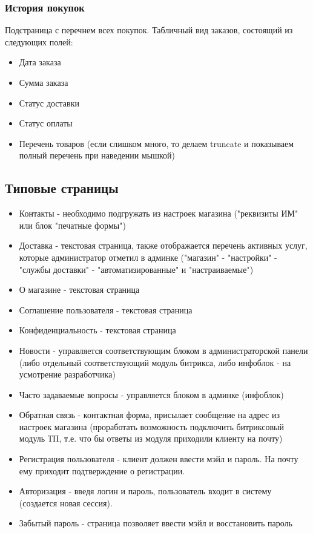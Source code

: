 \documentclass[DIV=calc, paper=a4, fontsize=11pt]{scrartcl} %
\begin{document}
\subsubsection{История покупок}
Подстраница с перечнем всех покупок. Табличный вид заказов, состоящий из следующих полей:
\begin{itemize}
	\item Дата заказа
	\item Сумма заказа
	\item Статус доставки
	\item Статус оплаты
	\item Перечень товаров (если слишком много, то делаем truncate и показываем полный перечень при наведении мышкой)
\end{itemize}

\subsection{Типовые страницы}

\begin{itemize}
	\item Контакты - необходимо подгружать из настроек магазина ("реквизиты ИМ" или блок "печатные формы")
	\item Доставка - текстовая страница, также отображается перечень активных услуг, которые администратор отметил в админке ("магазин" - "настройки" - "службы доставки" - "автоматизированные" и "настраиваемые")
	\item О магазине - текстовая страница
	\item Соглашение пользователя - текстовая страница
	\item Конфиденциальность - текстовая страница
	\item Новости - управляется соответствующим блоком в администраторской панели (либо отдельный соответствующий модуль битрикса, либо инфоблок - на усмотрение разработчика)
	\item Часто задаваемые вопросы - управляется блоком в админке (инфоблок)
	\item Обратная связь - контактная форма, присылает сообщение на адрес из настроек магазина (проработать возможность подключить битриксовый модуль ТП, т.е. что бы ответы из модуля приходили клиенту на почту)
	\item Регистрация пользователя - клиент должен ввести мэйл и пароль. На почту ему приходит подтверждение о регистрации.
	\item Авторизация - введя логин и пароль, пользователь входит в систему (создается новая сессия).
	\item Забытый пароль - страница позволяет ввести мэйл и восстановить пароль
\end{itemize}
\end{document}
